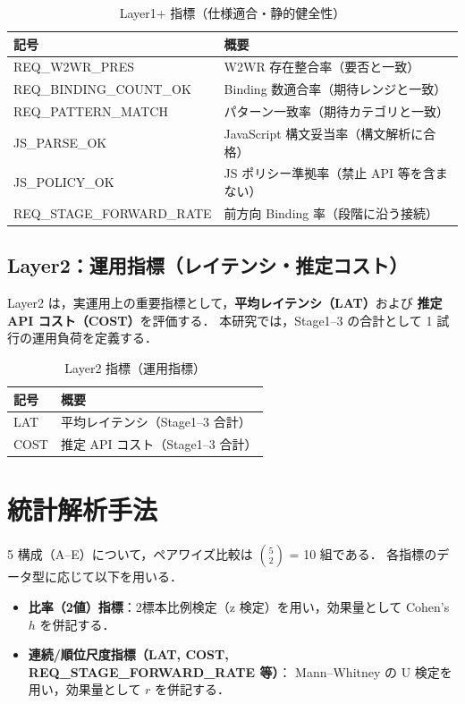 \documentclass[senior,final,11pt,dvipdfmx]{iputit-thesis}
\begin{document}
\begin{table}[!t]
\centering
\caption{Layer1+ 指標（仕様適合・静的健全性）}
\label{tab:metrics_layer1plus}
\small
\begin{tabular}{ll} \toprule
記号 & 概要 \\ \midrule
REQ\_W2WR\_PRES & W2WR 存在整合率（要否と一致）\\
REQ\_BINDING\_COUNT\_OK & Binding 数適合率（期待レンジと一致）\\
REQ\_PATTERN\_MATCH & パターン一致率（期待カテゴリと一致）\\
JS\_PARSE\_OK & JavaScript 構文妥当率（構文解析に合格）\\
JS\_POLICY\_OK & JS ポリシー準拠率（禁止 API 等を含まない）\\
REQ\_STAGE\_FORWARD\_RATE & 前方向 Binding 率（段階に沿う接続）\\
\bottomrule
\end{tabular}
\end{table}

\subsection{Layer2：運用指標（レイテンシ・推定コスト）}
Layer2 は，実運用上の重要指標として，\textbf{平均レイテンシ（LAT）}および \textbf{推定 API コスト（COST）}を評価する．
本研究では，Stage1--3 の合計として 1 試行の運用負荷を定義する．

\begin{table}[!t]
\centering
\caption{Layer2 指標（運用指標）}
\label{tab:metrics_layer2}
\small
\begin{tabular}{ll} \toprule
記号 & 概要 \\ \midrule
LAT & 平均レイテンシ（Stage1--3 合計）\\
COST & 推定 API コスト（Stage1--3 合計）\\
\bottomrule
\end{tabular}
\end{table}

\section{統計解析手法}
5 構成（A--E）について，ペアワイズ比較は $5 \choose 2$ = 10 組である．
各指標のデータ型に応じて以下を用いる．

\begin{itemize}
  \item \textbf{比率（2値）指標}：2標本比例検定（z 検定）を用い，効果量として Cohen's $h$ を併記する．
  \item \textbf{連続/順位尺度指標（LAT, COST, REQ\_STAGE\_FORWARD\_RATE 等）}：
        Mann--Whitney の U 検定を用い，効果量として $r$ を併記する．
\end{itemize}
\end{document}
